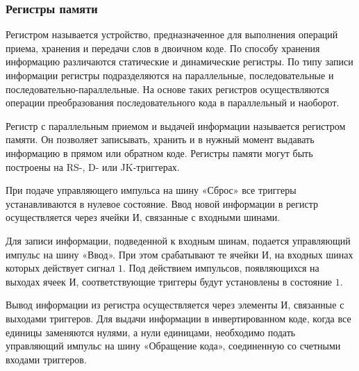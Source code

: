 \documentclass{article}
\begin{document}
\begin{flushleft}
\subsubsection{Регистры памяти}

Регистром называется устройство, предназначенное для выполнения операций приема, хранения и передачи слов в двоичном коде. По способу хранения информацию различаются статические и динамические регистры. По типу записи информации регистры подразделяются на параллельные, последовательные и последовательно-параллельные. На основе таких регистров осуществляются операции преобразования последовательного кода в параллельный и наоборот.

\hfill

Регистр с параллельным приемом и выдачей информации называется регистром памяти. Он позволяет записывать, хранить и в нужный момент выдавать информацию в прямом или обратном коде. Регистры памяти могут быть построены на RS-, D- или JK-триггерах.

\hfill

При подаче управляющего импульса на шину «Сброс» все триггеры устанавливаются в нулевое состояние. Ввод новой информации в регистр осуществляется через ячейки И, связанные с входными шинами.

Для записи информации, подведенной к входным шинам, подается управляющий импульс на шину «Ввод». При этом срабатывают те ячейки И, на входных шинах которых действует сигнал $1$. Под действием импульсов, появляющихся на выходах ячеек И, соответствующие триггеры будут установлены в состояние $1$.

Вывод информации из регистра осуществляется через элементы И, связанные с выходами триггеров. Для выдачи информации в инвертированном коде, когда все единицы заменяются нулями, а нули единицами, необходимо подать управляющий импульс на шину «Обращение кода», соединенную со счетными входами триггеров.

\end{flushleft}
\end{document}
